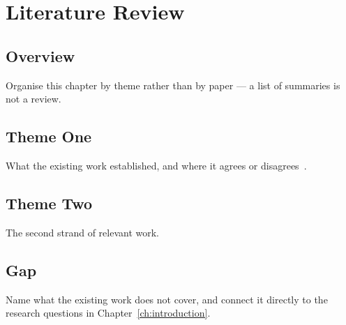 \chapter{Literature Review}
\label{ch:literature-review}

\section{Overview}

Organise this chapter by theme rather than by paper — a list of
summaries is not a review.

\section{Theme One}

What the existing work established, and where it agrees or
disagrees~\cite{knuth1984texbook}.

\section{Theme Two}

The second strand of relevant work.

\section{Gap}

Name what the existing work does not cover, and connect it directly to
the research questions in Chapter~\ref{ch:introduction}.
